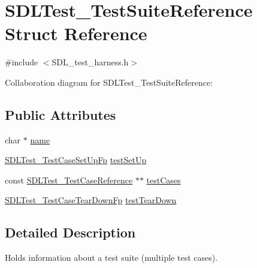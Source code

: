 \hypertarget{struct_s_d_l_test___test_suite_reference}{\section{S\-D\-L\-Test\-\_\-\-Test\-Suite\-Reference Struct Reference}
\label{struct_s_d_l_test___test_suite_reference}
}


{\ttfamily \#include $<$S\-D\-L\-\_\-test\-\_\-harness.\-h$>$}



Collaboration diagram for S\-D\-L\-Test\-\_\-\-Test\-Suite\-Reference\-:
\subsection*{Public Attributes}
\begin{DoxyCompactItemize}
\item 
char $\ast$ \hyperlink{struct_s_d_l_test___test_suite_reference_a8b002d932f91b321b384e59ae17f8f39}{name}
\item 
\hyperlink{_s_d_l__test__harness_8h_ac995a74bcb5eedd4aa06e888ae522862}{S\-D\-L\-Test\-\_\-\-Test\-Case\-Set\-Up\-Fp} \hyperlink{struct_s_d_l_test___test_suite_reference_a8aa788b982efb93c93c2ab01202e0007}{test\-Set\-Up}
\item 
const \hyperlink{struct_s_d_l_test___test_case_reference}{S\-D\-L\-Test\-\_\-\-Test\-Case\-Reference} $\ast$$\ast$ \hyperlink{struct_s_d_l_test___test_suite_reference_a06d97ce5bcf9ceb1300cc4aa39c028d3}{test\-Cases}
\item 
\hyperlink{_s_d_l__test__harness_8h_ab5047d0e13a626b93d696e06cfa748fd}{S\-D\-L\-Test\-\_\-\-Test\-Case\-Tear\-Down\-Fp} \hyperlink{struct_s_d_l_test___test_suite_reference_ad66abaf20653fd7361d28c69f88ac702}{test\-Tear\-Down}
\end{DoxyCompactItemize}


\subsection{Detailed Description}
Holds information about a test suite (multiple test cases). 

